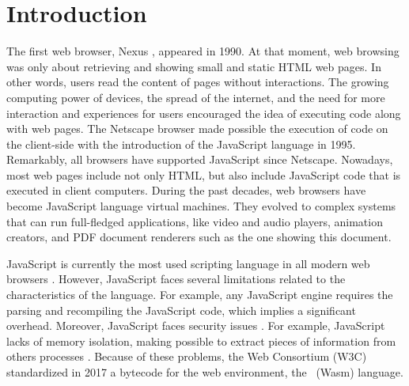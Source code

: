 \chapter{Introduction}
\label{chapter:intro}


The first web browser, Nexus \cite{nexus}, appeared in 1990.
At that moment, web browsing was only about retrieving and showing small and static HTML web pages.
In other words, users read the content of pages without interactions.
The growing computing power of devices, the spread of the internet, and the need for more interaction and experiences for users encouraged the idea of executing code along with web pages.
The Netscape browser made possible the execution of code on the client-side with the introduction of the JavaScript \cite{10.1007/978-3-642-14107-2_7} language in 1995.
Remarkably, all browsers have supported JavaScript since Netscape. 
Nowadays, most web pages include not only HTML, but also include JavaScript code that is executed in client computers.
During the past decades, web browsers have become JavaScript language virtual machines. 
They evolved to complex systems that can run full-fledged applications, like video and audio players, animation creators, and PDF document renderers such as the one showing this document.



JavaScript is currently the most used scripting language in all modern web browsers \cite{mulazzani2013fast}. 
However, JavaScript faces several limitations related to the characteristics of the language. For example, any JavaScript engine requires the parsing and recompiling the JavaScript code, which implies a significant overhead.
Moreover, JavaScript faces security issues \cite{10.1145/1190216.1190252}.
For example, JavaScript lacks of memory isolation, making possible to extract pieces of information from others processes \cite{10.1145/3412841.3442001}.
Because of these problems, the Web Consortium (W3C) standardized in 2017 a bytecode for the web environment, the \wasm\ (Wasm) language. 

